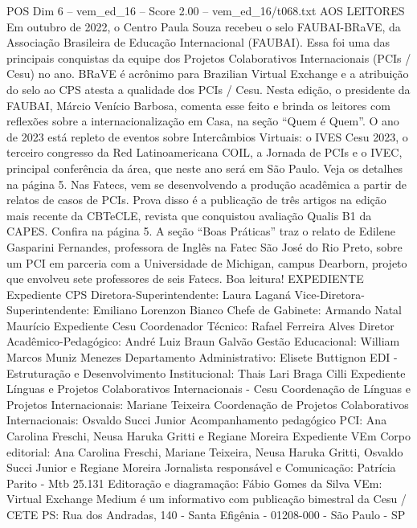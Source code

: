 \begin{textsample}{POS Dim 6 – vem\_ed\_16 – Score 2.00 – vem\_ed\_16/t068.txt}  \label{ex:f6_pos_145}
AOS LEITORES Em outubro de 2022, o Centro Paula Souza recebeu o selo FAUBAI-BRaVE, da Associação Brasileira de Educação Internacional (FAUBAI).
Essa foi uma das principais conquistas da equipe dos Projetos Colaborativos Internacionais (PCIs / Cesu) no ano.
BRaVE é acrônimo para Brazilian Virtual Exchange e a atribuição do selo ao CPS atesta a qualidade dos PCIs / Cesu.
Nesta edição, o presidente da FAUBAI, Márcio Venício Barbosa, comenta esse feito e brinda os leitores com reflexões sobre a internacionalização em Casa, na seção “Quem é Quem”.
O ano de 2023 está repleto de eventos sobre Intercâmbios Virtuais: o IVES Cesu 2023, o terceiro congresso da Red Latinoamericana COIL, a Jornada de PCIs e o IVEC, principal conferência da área, que neste ano será em São Paulo.
Veja os detalhes na página 5.
Nas Fatecs, vem se desenvolvendo a produção acadêmica a partir de relatos de casos de PCIs.
Prova disso é a publicação de três artigos na edição mais recente da CBTeCLE, revista que conquistou avaliação Qualis B1 da CAPES.
Confira na página 5.
A seção “Boas Práticas” traz o relato de Edilene Gasparini Fernandes, professora de Inglês na Fatec São José do Rio Preto, sobre um PCI em parceria com a Universidade de Michigan, campus Dearborn, projeto que envolveu sete professores de seis Fatecs.
Boa leitura!
EXPEDIENTE Expediente CPS Diretora-Superintendente: Laura Laganá Vice-Diretora-Superintendente: Emiliano Lorenzon Bianco Chefe de Gabinete: Armando Natal Maurício Expediente Cesu Coordenador Técnico: Rafael Ferreira Alves Diretor Acadêmico-Pedagógico: André Luiz Braun Galvão Gestão Educacional: William Marcos Muniz Menezes Departamento Administrativo: Elisete Buttignon EDI - Estruturação e Desenvolvimento Institucional: Thais Lari Braga Cilli Expediente Línguas e Projetos Colaborativos Internacionais - Cesu Coordenação de Línguas e Projetos Internacionais: Mariane Teixeira Coordenação de Projetos Colaborativos Internacionais: Osvaldo Succi Junior Acompanhamento pedagógico PCI: Ana Carolina Freschi, Neusa Haruka Gritti e Regiane Moreira Expediente VEm Corpo editorial: Ana Carolina Freschi, Mariane Teixeira, Neusa Haruka Gritti, Osvaldo Succi Junior e Regiane Moreira Jornalista responsável e Comunicação: Patrícia Parito - Mtb 25.131 Editoração e diagramação: Fábio Gomes da Silva VEm: Virtual Exchange Medium é um informativo com publicação bimestral da Cesu / CETE PS: Rua dos Andradas, 140 - Santa Efigênia - 01208-000 - São Paulo - SP

\end{textsample}
